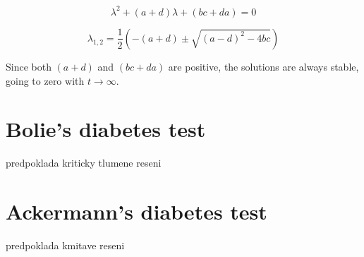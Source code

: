 \documentclass{article}
\begin{document}
\begin{equation}
\lambda^2+(a+d)\lambda+(bc+da)=0
\end{equation}

\begin{equation}
\lambda_{1,2}=\frac{1}{2}\left(-(a+d)\pm \sqrt{(a-d)^2-4bc}\right)
\end{equation}

Since both $(a+d)$ and $(bc+da)$ are positive, the solutions are always stable, going to zero with $t\rightarrow \infty$.

\section{Bolie's diabetes test}
predpoklada kriticky tlumene reseni

\section{Ackermann's diabetes test}
predpoklada kmitave reseni


%        
\end{document}
